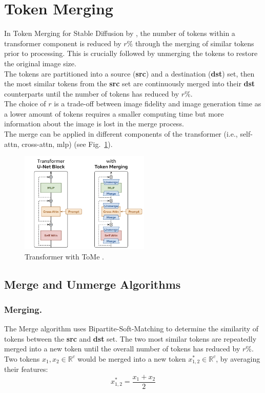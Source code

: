 \section{Token Merging} \label{token_merging}
In Token Merging for Stable Diffusion by \cite{bolya2023tomesd}, the number of tokens within a transformer component is reduced by \(r\%\) through the merging of similar tokens prior to processing. This is crucially followed by unmerging the tokens to restore the original image size.\\
The tokens are partitioned into a source (\textbf{src}) and a destination (\textbf{dst}) set, then the most similar tokens from the \textbf{src} set are continuously merged into their \textbf{dst} counterparts until the number of tokens has reduced by \(r\)\%.\\
The choice of \(r\) is a trade-off between image fidelity and image generation time as a lower amount of tokens requires a smaller computing time but more information about the image is lost in the merge process.\\
The merge can be applied in different components of the transformer (i.e., self-attn, cross-attn, mlp) (see Fig.~\ref{fig:tome}).
\begin{figure}[!htb]
\centering
\includegraphics[width=0.55\textwidth]
{static/transformer_graphic.png}
\caption{Transformer with ToMe \cite[Fig.~2]{bolya2023tomesd}.}
\label{fig:tome}
\end{figure}



\subsection{Merge and Unmerge Algorithms}
\subsubsection*{Merging.} The Merge algorithm uses Bipartite-Soft-Matching to determine the similarity of tokens between the \textbf{src} and \textbf{dst} set. The two most similar tokens are repeatedly merged into a new token until the overall number of tokens has reduced by \(r\%\).
Two tokens \(x_1, x_2 \in \mathbb{R}^c\) would be merged into a new token \(x_{1,2}^* \in \mathbb{R}^c \), by averaging their features: \[x_{1,2}^* = \frac{x_1 + x_2}{2}\]



